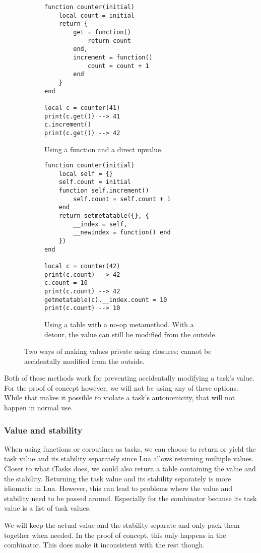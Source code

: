 \begin{figure}[ht]
\centering
\begin{subfigure}{0.40\textwidth}
\begin{verbatim}
function counter(initial)
    local count = initial
    return {
        get = function()
            return count
        end,
        increment = function()
            count = count + 1
        end
    }
end

local c = counter(41)
print(c.get()) --> 41
c.increment()
print(c.get()) --> 42
\end{verbatim}
\caption{Using a  function and a direct  upvalue.}
\label{lst:lua_private_a}
\end{subfigure}
\hspace{0.09\textwidth}
\begin{subfigure}{0.40\textwidth}
\begin{verbatim}
function counter(initial)
    local self = {}
    self.count = initial
    function self.increment()
        self.count = self.count + 1
    end
    return setmetatable({}, {
        __index = self,
        __newindex = function() end
    })
end

local c = counter(42)
print(c.count) --> 42
c.count = 10
print(c.count) --> 42
getmetatable(c).__index.count = 10
print(c.count) --> 10
\end{verbatim}
\caption{Using a table with a no-op  metamethod. With a detour, the value can still be modified from the outside.}
\label{lst:lua_private_b}
\end{subfigure}
\caption{Two ways of making values private using closures:  cannot be accidentally modified from the outside.}
\label{lst:lua_private}
\end{figure}

Both of these methods work for preventing accidentally modifying a task's value. For the proof of concept however, we will not be using any of these options. While that makes it possible to violate a task's autonomicity, that will not happen in normal use.

\subsubsection{Value and stability}
When using functions or coroutines as tasks, we can choose to return or yield the task value and its stability separately since Lua allows returning multiple values. Closer to what iTasks does, we could also return a table containing the value and the stability. Returning the task value and its stability separately is more idiomatic in Lua. However, this can lead to problems where the value and stability need to be passed around. Especially for the  combinator because its task value is a list of task values.

We will keep the actual value and the stability separate and only pack them together when needed. In the proof of concept, this only happens in the  combinator. This does make it inconsistent with the rest though.
